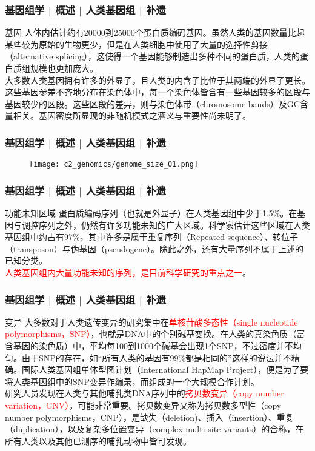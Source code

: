 \begin{frame}
  \frametitle{基因组学 | 概述 | 人类基因组 | 补遗}
  \begin{block}{基因}
人体内估计约有20000到25000个蛋白质编码基因。虽然人类的基因数量比起某些较为原始的生物更少，但是在人类细胞中使用了大量的选择性剪接（alternative splicing），这使得一个基因能够制造出多种不同的蛋白质，人类的蛋白质组规模也更加庞大。\\
\vspace{1em}
大多数人类基因拥有许多的外显子，且人类的内含子比位于其两端的外显子更长。这些基因参差不齐地分布在染色体中，每一个染色体皆含有一些基因较多的区段与基因较少的区段。这些区段的差异，则与染色体带（chromosome bands）及GC含量相关。基因密度所显现的非随机模式之涵义与重要性尚未明了。
  \end{block}
\end{frame}

\begin{frame}
  \frametitle{基因组学 | 概述 | 人类基因组 | 补遗}
  \begin{figure}
    \centering
    \texttt{[image: c2\_genomics/genome\_size\_01.png]}
  \end{figure}
\end{frame}

\begin{frame}
  \frametitle{基因组学 | 概述 | 人类基因组 | 补遗}
  \begin{block}{功能未知区域}
蛋白质编码序列（也就是外显子）在人类基因组中少于1.5\%。在基因与调控序列之外，仍然有许多功能未知的广大区域。科学家估计这些区域在人类基因组中约占有97\%，其中许多是属于重复序列（Repeated sequence）、转位子（transposon）与伪基因（pseudogene）。除此之外，还有大量序列不属于上述的已知分类。\\
\vspace{1em}
\textcolor{red}{人类基因组内大量功能未知的序列，是目前科学研究的重点之一}。
  \end{block}
\end{frame}

\begin{frame}
  \frametitle{基因组学 | 概述 | 人类基因组 | 补遗}
  \begin{block}{变异}
    大多数对于人类遗传变异的研究集中在\textcolor{red}{单核苷酸多态性（single nucleotide polymorphisms，SNP）}，也就是DNA中的个别碱基变换。在人类的真染色质（富含基因的染色质）中，平均每100到1000个碱基会出现1个SNP，不过密度并不均匀。由于SNP的存在，如“所有人类的基因有99\%都是相同的”这样的说法并不精确。国际人类基因组单体型图计划（International HapMap Project），便是为了要将人类基因组中的SNP变异作编录，而组成的一个大规模合作计划。\\
\vspace{1em}
研究人员发现在人类与其他哺乳类DNA序列中的\textcolor{red}{拷贝数变异（copy number variation，CNV）}，可能非常重要。拷贝数变异又称为拷贝数多型性（copy number polymorphisms，CNP），是缺失（deletion)、插入（insertion）、重复（duplication），以及复杂多位置变异（complex multi-site variants）的合称，在所有人类以及其他已测序的哺乳动物中皆可发现。
  \end{block}
\end{frame}

